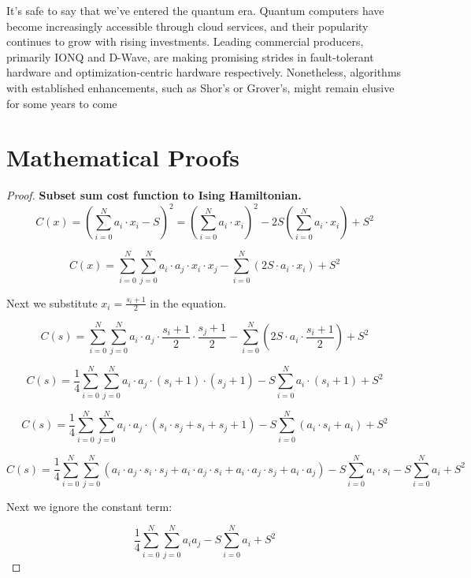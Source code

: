 \documentclass[12pt,a4paper]{report}
\begin{document}
\noindent
It’s safe to say that we’ve entered the quantum era. Quantum computers have become increasingly accessible through cloud services, and their popularity continues to grow with rising investments. Leading commercial producers, primarily IONQ and D-Wave, are making promising strides in fault-tolerant hardware and optimization-centric hardware respectively. Nonetheless, algorithms with established enhancements, such as Shor’s or Grover’s, might remain elusive for some years to come

\appendix

\chapter{Mathematical Proofs}
\newtheorem{proof}{Proof}
\begin{proof}
\textbf{Subset sum cost function to Ising Hamiltonian.}
\[C(x) = \left(\sum_{i=0}^{N} a_i \cdot x_i - S\right)^2 = \left(\sum_{i=0}^{N} a_i \cdot x_i\right)^2 - 2S \left(\sum_{i=0}^{N} a_i \cdot x_i\right) + S^2\]

\[C(x) = \sum_{i=0}^{N} \sum_{j=0}^{N} a_i \cdot a_j \cdot x_i \cdot x_j - \sum_{i=0}^{N} \left(2S \cdot a_i \cdot x_i\right) + S^2\]

    \begin{center}
    Next we substitute \(x_i = \frac{s_i + 1}{2}\) in the equation.
    \end{center}

\[C(s) = \sum_{i=0}^{N} \sum_{j=0}^{N} a_i \cdot a_j \cdot \frac{{s_i + 1}}{2} \cdot \frac{{s_j + 1}}{2} - \sum_{i=0}^{N} \left(2S \cdot a_i \cdot \frac{{s_i + 1}}{2}\right) + S^2\]

\[C(s) = \frac{1}{4} \sum_{i=0}^{N} \sum_{j=0}^{N} a_i \cdot a_j \cdot (s_i + 1) \cdot (s_j + 1) - S \sum_{i=0}^{N} a_i \cdot (s_i + 1) + S^2 \]

\[C(s) = \frac{1}{4} \sum_{i=0}^{N} \sum_{j=0}^{N} a_i \cdot a_j \cdot (s_i \cdot s_j + s_i + s_j + 1) - S \sum_{i=0}^{N} (a_i \cdot s_i + a_i) + S^2 \]

\[C(s) = \frac{1}{4} \sum_{i=0}^{N} \sum_{j=0}^{N} (a_i \cdot a_j \cdot s_i \cdot s_j + a_i \cdot a_j \cdot s_i + a_i \cdot a_j \cdot s_j + a_i \cdot a_j) - S \sum_{i=0}^{N} a_i \cdot s_i - S \sum_{i=0}^{N} a_i + S^2 \]

\begin{center}
Next we ignore the constant term:
\end{center}

\[ \frac{1}{4} \sum_{i=0}^{N} \sum_{j=0}^{N} a_i a_j - S \sum_{i=0}^{N} a_i + S^2 \]


\end{proof}
\end{document}
